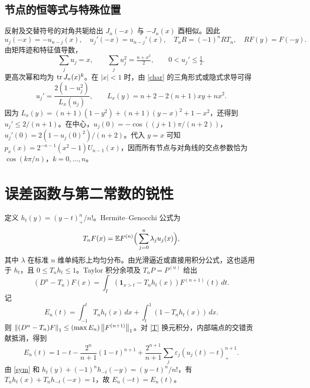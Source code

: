 \documentclass[11pt,a4paper,fontset=fandol]{ctexart}
\begin{document}
\subsection{节点的恒等式与特殊位置}
反射及交替符号的对角共轭给出 $J_n(-x)$ 与 $-J_n(x)$ 酉相似。因此
\begin{equation}\label{sym}
 u_j(-x)=-u_{n-j}(x),\quad u_j'(-x)=u_{n-j}'(x),\quad T_nR=(-1)^nRT_n,
 \quad RF(y)=F(-y).
\end{equation}
由矩阵迹和特征值导数，
\[
 \sum_j u_j=x,\qquad \sum_j u_j^2=\tfrac{n+x^2}{2},\qquad 0<u_j'\le\tfrac12.
\]
更高次幂和均为 $\operatorname{tr} J_n(x)^k$。在 $|x|<1$ 时，由 \eqref{char} 的三角形式或隐式求导可得
\begin{equation}\label{speed}
 u_j'=\frac{2(1-u_j^2)}{L_x(u_j)},\qquad L_x(y)=n+2-2(n+1)xy+nx^2.
\end{equation}
因为 $L_x(y)=(n+1)(1-y^2)+(n+1)(y-x)^2+1-x^2$，还得到 $u_j'\le2/(n+1)$。在中心，$u_j(0)=-\cos((j+1)\pi/(n+2))$，$u_j'(0)=2(1-u_j(0)^2)/(n+2)$。代入 $y=x$ 可知 $p_x(x)=2^{-n-1}(x^2-1)U_{n-1}(x)$，因而所有节点与对角线的交点参数恰为 $\cos(k\pi/n)$，$k=0,\ldots,n$。

\section{误差函数与第二常数的锐性}\label{sec:sharp}
定义 $h_t(y)=(y-t)_+^n/n!$。Hermite--Genocchi 公式为
\[
 T_nF(x)=\mathbb E F^{(n)}\Big(\sum_{j=0}^n\lambda_j u_j(x)\Big),
\]
其中 $\lambda$ 在标准 $n$ 维单纯形上均匀分布。由光滑逼近或直接用积分公式，这也适用于 $h_t$，且 $0\le T_nh_t\le1$。Taylor 积分余项及 $T_nP=P^{(n)}$ 给出
\[
 (D^n-T_n)F(x)=\int_I(\mathbf1_{x>t}-T_nh_t(x))F^{(n+1)}(t)\,dt.
\]
记
\begin{equation}\label{E}
 E_n(t)=\int_{-1}^tT_nh_t(x)\,dx+\int_t^1(1-T_nh_t(x))\,dx.
\end{equation}
则 $\left\|(D^n-T_n)F\right\|_1\le (\max E_n)\left\|F^{(n+1)}\right\|_1$。对 \eqref{T} 换元积分，内部端点的交错贡献抵消，得到
\begin{equation}\label{Eexplicit}
 \boxed{E_n(t)=1-t-\frac{2^n}{n+1}(1-t)^{n+1}
 +\frac{2^{n+1}}{n+1}\sum_j\varepsilon_j(u_j(t)-t)_+^{n+1}.}
\end{equation}
由 \eqref{sym} 和 $h_t(y)+(-1)^nh_{-t}(-y)=(y-t)^n/n!$，有 $T_nh_t(x)+T_nh_{-t}(-x)=1$，故 $E_n(-t)=E_n(t)$。
\end{document}
